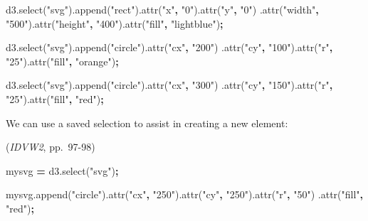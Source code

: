 \documentclass[openany]{book}
\newenvironment{Shaded}{\begin{snugshade}}{\end{snugshade}}
\newcommand{\AttributeTok}[1]{\textcolor[rgb]{0.77,0.63,0.00}{#1}}
\newcommand{\NormalTok}[1]{#1}
\newcommand{\OperatorTok}[1]{\textcolor[rgb]{0.81,0.36,0.00}{\textbf{#1}}}
\newcommand{\StringTok}[1]{\textcolor[rgb]{0.31,0.60,0.02}{#1}}
\newcommand{\VariableTok}[1]{\textcolor[rgb]{0.00,0.00,0.00}{#1}}
\begin{document}
\begin{Shaded}
\begin{Highlighting}[]
\VariableTok{d3}\NormalTok{.}\AttributeTok{select}\NormalTok{(}\StringTok{"svg"}\NormalTok{).}\AttributeTok{append}\NormalTok{(}\StringTok{"rect"}\NormalTok{).}\AttributeTok{attr}\NormalTok{(}\StringTok{"x"}\OperatorTok{,} \StringTok{"0"}\NormalTok{).}\AttributeTok{attr}\NormalTok{(}\StringTok{"y"}\OperatorTok{,} \StringTok{"0"}\NormalTok{)}
\NormalTok{    .}\AttributeTok{attr}\NormalTok{(}\StringTok{"width"}\OperatorTok{,} \StringTok{"500"}\NormalTok{).}\AttributeTok{attr}\NormalTok{(}\StringTok{"height"}\OperatorTok{,} \StringTok{"400"}\NormalTok{).}\AttributeTok{attr}\NormalTok{(}\StringTok{"fill"}\OperatorTok{,} \StringTok{"lightblue"}\NormalTok{)}\OperatorTok{;}
    
\VariableTok{d3}\NormalTok{.}\AttributeTok{select}\NormalTok{(}\StringTok{"svg"}\NormalTok{).}\AttributeTok{append}\NormalTok{(}\StringTok{"circle"}\NormalTok{).}\AttributeTok{attr}\NormalTok{(}\StringTok{"cx"}\OperatorTok{,} \StringTok{"200"}\NormalTok{)}
\NormalTok{    .}\AttributeTok{attr}\NormalTok{(}\StringTok{"cy"}\OperatorTok{,} \StringTok{"100"}\NormalTok{).}\AttributeTok{attr}\NormalTok{(}\StringTok{"r"}\OperatorTok{,} \StringTok{"25"}\NormalTok{).}\AttributeTok{attr}\NormalTok{(}\StringTok{"fill"}\OperatorTok{,} \StringTok{"orange"}\NormalTok{)}\OperatorTok{;}
    
\VariableTok{d3}\NormalTok{.}\AttributeTok{select}\NormalTok{(}\StringTok{"svg"}\NormalTok{).}\AttributeTok{append}\NormalTok{(}\StringTok{"circle"}\NormalTok{).}\AttributeTok{attr}\NormalTok{(}\StringTok{"cx"}\OperatorTok{,} \StringTok{"300"}\NormalTok{)}
\NormalTok{    .}\AttributeTok{attr}\NormalTok{(}\StringTok{"cy"}\OperatorTok{,} \StringTok{"150"}\NormalTok{).}\AttributeTok{attr}\NormalTok{(}\StringTok{"r"}\OperatorTok{,} \StringTok{"25"}\NormalTok{).}\AttributeTok{attr}\NormalTok{(}\StringTok{"fill"}\OperatorTok{,} \StringTok{"red"}\NormalTok{)}\OperatorTok{;}  
\end{Highlighting}
\end{Shaded}

We can use a saved selection to assist in creating a new element:

(\emph{IDVW2}, pp.~97-98)

\begin{Shaded}
\begin{Highlighting}[]
\NormalTok{mysvg }\OperatorTok{=} \VariableTok{d3}\NormalTok{.}\AttributeTok{select}\NormalTok{(}\StringTok{"svg"}\NormalTok{)}\OperatorTok{;}

\VariableTok{mysvg}\NormalTok{.}\AttributeTok{append}\NormalTok{(}\StringTok{"circle"}\NormalTok{).}\AttributeTok{attr}\NormalTok{(}\StringTok{"cx"}\OperatorTok{,} \StringTok{"250"}\NormalTok{).}\AttributeTok{attr}\NormalTok{(}\StringTok{"cy"}\OperatorTok{,} \StringTok{"250"}\NormalTok{).}\AttributeTok{attr}\NormalTok{(}\StringTok{"r"}\OperatorTok{,} \StringTok{"50"}\NormalTok{)}
\NormalTok{  .}\AttributeTok{attr}\NormalTok{(}\StringTok{"fill"}\OperatorTok{,} \StringTok{"red"}\NormalTok{)}\OperatorTok{;}
\end{Highlighting}
\end{Shaded}
\end{document}
